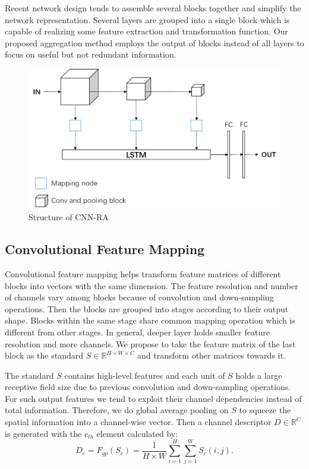 \documentclass[runningheads]{llncs}
\begin{document}
Recent network design tends to assemble several blocks together and simplify the network representation. Several layers are grouped into a single block which is capable of realizing some feature extraction and transformation function. Our proposed aggregation method employs the output of blocks instead of all layers to focus on useful but not redundant information. 

\begin{figure}  
	\centering
	\includegraphics[width=12cm]{Figures/CNN-RA.png}
	\caption{Structure of CNN-RA}
	\label{fig:CNN-RA}
\end{figure}

\subsection{Convolutional Feature Mapping}

Convolutional feature mapping helps transform feature matrices of different blocks into vectors with the same dimension. The feature resolution and number of channels vary among blocks because of convolution and down-sampling operations. Then the blocks are grouped into stages according to their output shape. Blocks within the same stage share common mapping operation which is different from other stages. In general, deeper layer holds smaller feature resolution and more channels. We propose to take the feature matrix of the last block as the standard $S \in \mathbb{R}^{H\times W \times C}$ and transform other matrices towards it. 

The standard $S$ contains high-level features and each unit of $S$ holds a large receptive field size due to previous convolution and down-sampling operations. For such output features we tend to exploit their channel dependencies instead of total information. Therefore, we do global average pooling on $S$ to squeeze the spatial information into a channel-wise vector. Then a channel descriptor $D\in \mathbb{R}^C$ is generated with the $c_{th}$ element calculated by:
\begin{equation}
D_c = F_{gp}(S_c) = \frac{1}{H\times W}\sum_{i=1}^H\sum_{j=1}^W S_c(i,j).
\end{equation}
\end{document}
